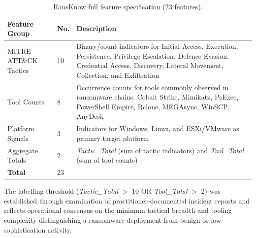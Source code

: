 \begin{table}[ht]
\centering
\caption{RansKnow full feature specification (23 features).}
\label{tab:app_ransknow_features}
\renewcommand{\arraystretch}{1.3}
\begin{tabular}{@{}llp{7.5cm}@{}}
\toprule
\textbf{Feature Group} & \textbf{No.} & \textbf{Description} \\
\midrule
MITRE ATT\&CK Tactics & 10 & Binary/count indicators for Initial Access, Execution, Persistence, Privilege Escalation, Defence Evasion, Credential Access, Discovery, Lateral Movement, Collection, and Exfiltration \\
\addlinespace
Tool Counts & 8 & Occurrence counts for tools commonly observed in ransomware chains: Cobalt Strike, Mimikatz, PsExec, PowerShell Empire, Rclone, MEGAsync, WinSCP, AnyDesk \\
\addlinespace
Platform Signals & 3 & Indicators for Windows, Linux, and ESXi/VMware as primary target platform \\
\addlinespace
Aggregate Totals & 2 & \textit{Tactic\_Total} (sum of tactic indicators) and \textit{Tool\_Total} (sum of tool counts) \\
\midrule
\textbf{Total} & 23 & \\
\bottomrule
\end{tabular}
\end{table}

\noindent The labelling threshold (\textit{Tactic\_Total} $>$ 10 OR \textit{Tool\_Total}
$>$ 2) was established through examination of practitioner-documented incident reports
and reflects operational consensus on the minimum tactical breadth and tooling complexity
distinguishing a ransomware deployment from benign or low-sophistication activity.
